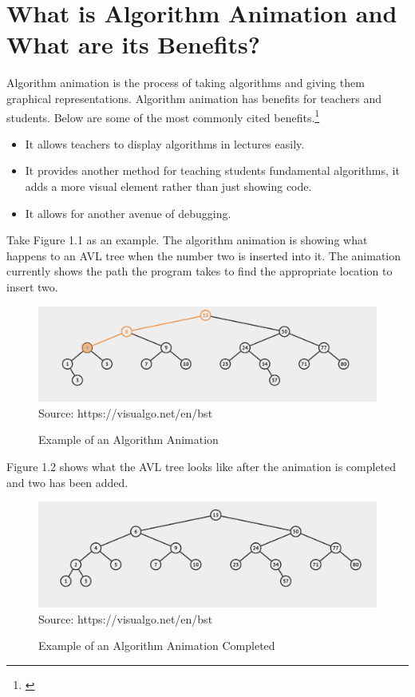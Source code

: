 \documentclass[12pt,twoside]{reedthesis}
\begin{document}
\section{What is Algorithm Animation and What are its Benefits?}	
Algorithm animation is the process of taking algorithms and giving them graphical representations. Algorithm animation has benefits for teachers and students. Below are some of the most commonly cited benefits.\footnote{\cite{hundhausen_meta-study_2002}}
\begin{itemize}
\item It allows teachers to display algorithms in lectures easily.
\item It provides another method for teaching students fundamental algorithms, it adds a more visual element rather than just showing code. 
\item It allows for another avenue of debugging. 
\end{itemize}
Take Figure 1.1 as an example. The algorithm animation is showing what happens to an AVL tree when the number two is inserted into it. The animation currently shows the path the program takes to find the appropriate location to insert two. 
\begin{figure}[htbp] 
\begin{centering} 
\caption{Example of an Algorithm Animation}
\includegraphics[scale=0.4] {animexample}
\footnotesize{Source: https://visualgo.net/en/bst}
\label{animexample}
\end{centering} 
\end{figure}
Figure 1.2 shows what the AVL tree looks like after the animation is completed and two has been added. 
\begin{figure}[htbp] 
\begin{centering} 
\caption{Example of an Algorithm Animation Completed}
\includegraphics[scale=0.44] {animDone}
\footnotesize{Source: https://visualgo.net/en/bst}
\label{animexample}
\end{centering} 
\end{figure}
\end{document}
